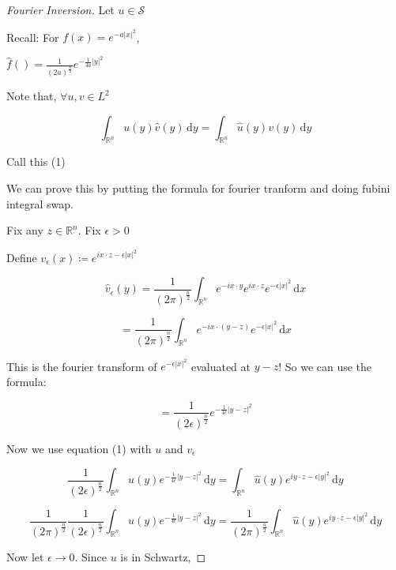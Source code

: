 \documentclass{article}
\theoremstyle{definition}
\begin{document}
\begin{proof}
    [Fourier Inversion]

    Let \(u\in \mathcal{S}\)
    
    Recall: For \(f(x) = e^{- a \vert x \vert ^2}\),
    
    \(\hat{f}() = \frac{1}{(2a)^{\frac{n}{2}}}e^{-\frac{1}{4a}\vert y \vert ^2}\) 

    Note that, \(\forall u,v\in L^2\) 
    
    \[
        \int_{\mathbb{R}^n}^{} u(y)\hat{v}(y) \,\mathrm{d}y = \int_{\mathbb{R}^n}^{} \hat{u}(y)v(y) \,\mathrm{d}y 
    \]

    Call this (1)

    We can prove this by putting the formula for fourier tranform and doing fubini integral swap.

    Fix any \(z\in\mathbb{R}^n\). Fix \(\epsilon > 0\) 

    Define \(v_{\epsilon}(x) \coloneqq e^{i x\cdot z - \epsilon \vert x \vert ^2} \) 

    \[
        \hat{v}_{\epsilon}(y) = \frac{1}{(2\pi)^{\frac{n}{2}}}\int_{\mathbb{R}^n}^{} e^{-ix\cdot y} e^{ix\cdot z}e^{-\epsilon \vert x \vert ^2} \,\mathrm{d}x  
    \]

    \[
        =\frac{1}{(2\pi )^\frac{n}{2}}\int_{\mathbb{R}^n}^{} e^{-ix\cdot (y-z)} e^{-\epsilon \vert x \vert ^2} \,\mathrm{d}x 
    \]

    This is the fourier transform of \(e^{-\epsilon \vert x \vert ^2}\) evaluated at \(y - z\)! So we can use the formula:

    \[
        = \frac{1}{(2\epsilon)^\frac{n}{2}}e^{-\frac{1}{4\epsilon}\vert y - z \vert ^2}
    \]

    Now we use equation (1) with \(u\) and \(v_{\epsilon} \) 

    \[
        \frac{1}{(2\epsilon)^\frac{n}{2}}\int_{\mathbb{R}^n}^{} u(y)e^{-\frac{1}{4\epsilon}\vert y - z \vert ^2}  \,\mathrm{d}y = \int_{\mathbb{R}^n}^{} \hat{u}(y)e^{iy\cdot z - \epsilon \vert y \vert ^2} \,\mathrm{d}y 
    \]

    \[
        \frac{1}{(2\pi)^\frac{n}{2}}\frac{1}{(2\epsilon)^\frac{n}{2}}\int_{\mathbb{R}^n}^{} u(y)e^{-\frac{1}{4\epsilon}\vert y - z \vert ^2}  \,\mathrm{d}y = \frac{1}{(2\pi)^\frac{n}{2}}\int_{\mathbb{R}^n}^{} \hat{u}(y)e^{iy\cdot z - \epsilon \vert y \vert ^2} \,\mathrm{d}y 
    \]

    Now let \(\epsilon  \to 0\). Since \(u\) is in Schwartz,


\end{proof}
\end{document}
